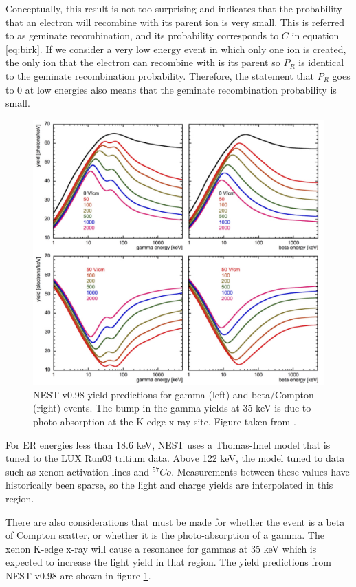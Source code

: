 Conceptually, this result is not too surprising and indicates that the probability that an electron will recombine with its parent ion is very small. This is referred to as geminate recombination, and its probability corresponds to $C$ in equation \ref{eq:birk}. If we consider a very low energy event in which only one ion is created, the only ion that the electron can recombine with is its parent so $P_R$ is identical to the geminate recombination probability. Therefore, the statement that $P_R$ goes to 0 at low energies also means that the geminate recombination probability is small.
\begin{figure}[!h]
\includegraphics[width=\linewidth]{Figures/nest_yields0p98.pdf}
\caption{NEST v0.98 yield predictions for gamma (left) and beta/Compton (right) events. The bump in the gamma yields at 35 keV is due to photo-absorption at the K-edge x-ray site. Figure taken from \cite{nest2}.}
\label{fig:nest_yields0p98} 
\end{figure}

For ER energies less than 18.6 keV, NEST uses a Thomas-Imel model that is tuned to the LUX Run03 tritium data\cite{lux_tritium}. Above 122 keV, the model tuned to data such as xenon activation lines and $^{57}Co$. Measurements between these values have historically been sparse, so the light and charge yields are interpolated in this region. 


There are also considerations that must be made for whether the event is a beta of Compton scatter, or whether it is the photo-absorption of a gamma. The xenon K-edge x-ray will cause a resonance for gammas at 35 keV which is expected to increase the light yield in that region. The yield predictions from NEST v0.98 are shown in figure \ref{fig:nest_yields0p98}.

